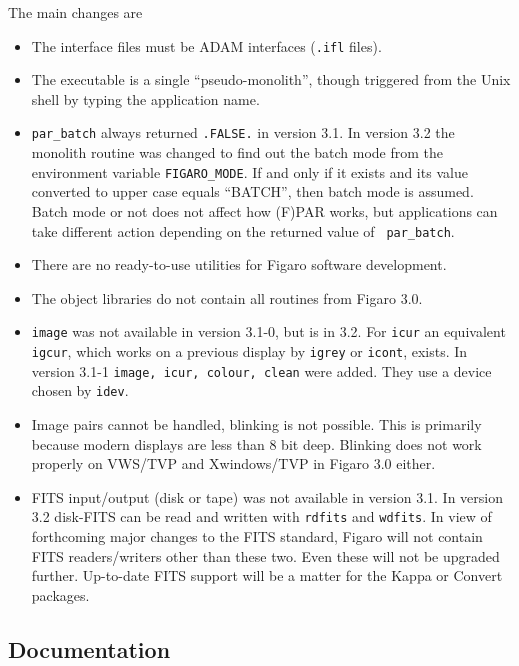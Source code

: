 The main changes are
   \begin{itemize}
      \item The interface files must be ADAM interfaces ({\tt .ifl}
         files).
      \item The executable is a single ``pseudo-monolith'', though
         triggered from the Unix shell by typing the application name.
      \item {\tt par\_batch} always returned {\tt .FALSE.} in version
         3.1.  In version 3.2 the monolith routine was changed to find
         out the batch mode from the environment variable {\tt FIGARO\_MODE}.
         If and only if it exists and its value converted to upper case
         equals ``BATCH'', then batch mode is assumed.  Batch mode or
         not does not affect how (F)PAR works, but applications can
         take different action depending on the returned value of {\tt
         par\_batch}.
      \item There are no ready-to-use utilities for Figaro software
         development.
      \item The object libraries do not contain all routines from Figaro
         3.0.
      \item {\tt image} was not available in version 3.1-0, but is in
         3.2.  For {\tt icur} an equivalent {\tt igcur}, which works on
         a previous display by {\tt igrey} or {\tt icont}, exists.  In
         version 3.1-1 {\tt image, icur, colour, clean} were added.
         They use a device chosen by {\tt idev}.
      \item Image pairs cannot be handled, blinking is not possible.
         This is primarily because modern displays are less than 8 bit
         deep. Blinking does not work properly on VWS/TVP and
         Xwindows/TVP in Figaro 3.0 either.
      \item FITS input/output (disk or tape) was not available in
         version 3.1.  In version 3.2 disk-FITS can be read and written
         with {\tt rdfits} and {\tt wdfits}.  In view of forthcoming
         major changes to the FITS standard, Figaro will not contain
         FITS readers/writers other than these two.  Even these will not
         be upgraded further.  Up-to-date FITS support will be a matter
         for the Kappa or Convert packages.
   \end{itemize}


\subsection{Documentation}

